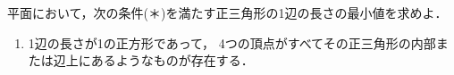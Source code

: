 \documentclass[../../main.tex]{subfiles}
\begin{document}
平面において，次の条件(＊)を満たす正三角形の1辺の長さの最小値を求めよ．
\begin{enumerate}
  \item[(＊)]1辺の長さが1の正方形であって，
    4つの頂点がすべてその正三角形の内部または辺上にあるようなものが存在する．
\end{enumerate}
\end{document}
